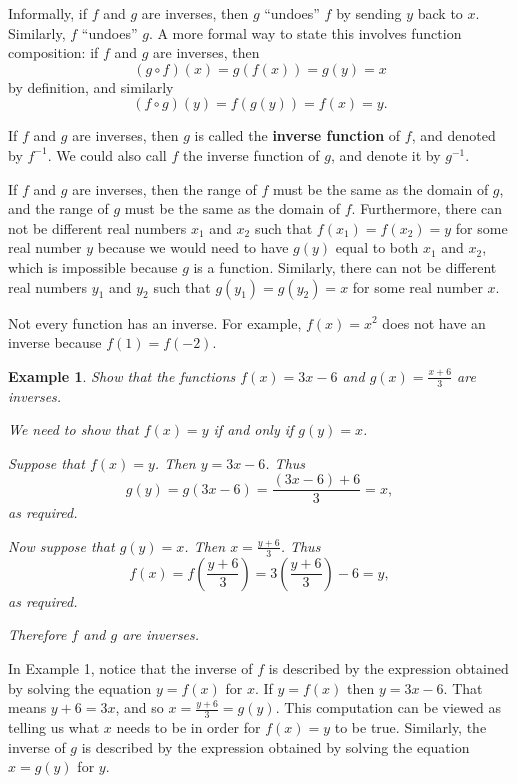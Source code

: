 \documentclass[11pt]{book}               %
\newtheorem{example}{Example}
\begin{document}
Informally, if $f$ and $g$ are inverses, then $g$ ``undoes'' $f$ by sending $y$ back to $x$. Similarly, $f$ ``undoes'' $g$.  A more formal way to state this involves function composition: if $f$ and $g$ are inverses, then
$$(g \circ f)(x) = g(f(x)) = g(y) = x$$
by definition, and similarly 
$$(f \circ g)(y) = f(g(y)) = f(x) = y.$$

If $f$ and $g$ are inverses, then $g$ is called the \textbf{inverse function} of $f$, and denoted by $f^{-1}$.  We could also call $f$ the inverse function of $g$, and  denote it by $g^{-1}$.

If $f$ and $g$ are inverses, then the range of $f$ must be the same as the domain of $g$, and the range of $g$ must be the same as the domain of $f$.  Furthermore, there can not be different real numbers $x_1$ and $x_2$ such that $f(x_1) = f(x_2) = y$ for some real number $y$ because we would need to have $g(y)$ equal to both $x_1$ and $x_2$, which is impossible because $g$ is a function.  Similarly, there can not be different real numbers $y_1$ and $y_2$ such that $g(y_1) = g(y_2) = x$ for some real number $x$.

Not every function has an inverse.  For example, $f(x) = x^2$ does not have an inverse because $f(1) = f(-2)$.

\begin{example}
Show that the functions $f(x) = 3x-6$ and $g(x) = \frac{x+ 6}{3}$ are inverses.
\normalfont

We need to show that $f(x) = y$ if and only if $g(y) = x$.

Suppose that $f(x) = y$.  Then $y = 3x-6$.  Thus 
$$g(y) = g(3x-6) = \frac{(3x-6)+6}{3} = x,$$
as required.

Now suppose that $g(y) = x$.  Then $x = \frac{y+ 6}{3}$.  Thus
$$f(x) = f(\frac{y+ 6}{3}) = 3\left(\frac{y+ 6}{3}\right) - 6 = y,$$
as required.

Therefore $f$ and $g$ are inverses.
\label{ex5,1}
\end{example}

In Example 1, notice that the inverse of $f$ is described by the expression obtained by solving the equation 
$y = f(x)$ for $x$.   If $y = f(x)$ then $y = 3x-6$.  That means $y+6 = 3x$, and so $x = \frac{y+6}{3} = g(y)$.  
This computation can be viewed as telling us what $x$ needs to be in order for $f(x) = y$ to be true.
Similarly, the inverse of $g$ is described by the expression obtained by solving the equation $x = g(y)$ for $y$.
\end{document}
